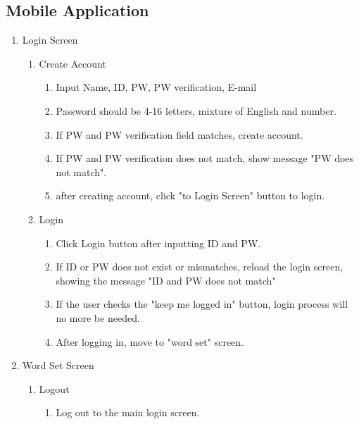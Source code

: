 \documentclass[conference]{IEEEtran}
\begin{document}
\subsection{Mobile Application}
\begin{enumerate}
    \item Login Screen
    \begin{enumerate}
        \item Create Account
            \begin{enumerate}
                \item Input Name, ID, PW, PW verification, E-mail
                \item Password should be 4-16 letters, mixture of English and number.
                \item If PW and PW verification field matches, create account.
                \item If PW and PW verification does not match, show message "PW does not match".
                \item after creating account, click "to Login Screen" button to login.
            \end{enumerate}
        \item Login
            \begin{enumerate}
                \item Click Login button after inputting ID and PW.
                \item If ID or PW does not exist or mismatches, reload the login screen, showing the message "ID and PW does not match"
                \item If the user checks the "keep me logged in" button, login process will no more be needed.
                \item After logging in, move to "word set" screen.
            \end{enumerate}
    \end{enumerate}
    \item Word Set Screen
        \begin{enumerate}
            \item Logout
                \begin{enumerate}
                    \item Log out to the main login screen.

\end{enumerate}
\end{enumerate}
\end{enumerate}
\end{document}
